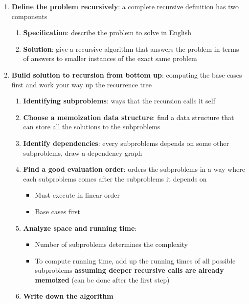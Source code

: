   \begin{enumerate}
    \item \textbf{Define the problem recursively}: a complete recursive
    definition has two components
    \begin{enumerate}
      \item \textbf{Specification}: describe the problem to solve in English
      \item \textbf{Solution}: give a recursive algorithm that answers
      the problem in terms of answers to smaller instances of the exact same
      problem
    \end{enumerate}

    \item \textbf{Build solution to recursion from bottom up}: computing the
    base cases first and work your way up the recurrence tree
    \begin{enumerate}
      \item \textbf{Identifying subproblems}: ways that the recursion calls it
      self
      \item \textbf{Choose a memoization data structure}: find a data structure
      that can store all the solutions to the subproblems
      \item \textbf{Identify dependencies}: every subproblems depends on
      some other subproblems, draw a dependency graph
      \item \textbf{Find a good evaluation order}: orders the subproblems in a
      way where each subproblems comes after the subproblems it depends on
      \begin{itemize}
        \item Must execute in linear order
        \item Base cases first
      \end{itemize}

      \item \textbf{Analyze space and running time}:
      \begin{itemize}
        \item Number of subproblems determines the complexity
        \item To compute running time, add up the running times of all possible
        subproblems \textbf{assuming deeper recursive calls are already
        memoized} (can be done after the first step)
      \end{itemize}

      \item \textbf{Write down the algorithm}
    \end{enumerate}
  \end{enumerate}

